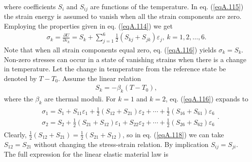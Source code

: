 \documentclass{AeroStructure-ERJohnson}
\begin{document}
where coefficients $S_{i}$ and $S_{i j}$ are functions of the temperature. In eq. (\ref{eqA.115}) the strain energy is assumed to vanish when all the strain components are zero. Employing the properties given in eq. (\ref{eqA.114}) we get
\begin{align}\label{eqA.116}
\sigma_{k}=\frac{\partial U}{\partial \varepsilon_{k}}=S_{k}+\sum_{j=1}^6 \frac{1}{2}(S_{k j}+S_{j k}) \varepsilon_{j},\ k=1,2, \ldots, 6.
\end{align}
Note that when all strain components equal zero, eq. (\ref{eqA.116}) yields $\sigma_{k}=S_{k}$. Non-zero stresses can occur in a state of vanishing strains when there is a change in temperature. Let the change in temperature from the reference state be denoted by $T-T_{0}$. Assume the linear relation
\begin{align}\label{eqA.117}
S_{k}=-\beta_{k}(T-T_{0}),
\end{align}
where the $\beta_{k}$ are thermal moduli. For $k = 1$ and $k = 2$, eq. (\ref{eqA.116}) expands to
\begin{align}\label{eqA.118}
\begin{aligned}
&\sigma_{1}=S_{1}+S_{11} \varepsilon_{1}+\frac{1}{2}(S_{12}+S_{21}) \varepsilon_{2}+\cdots+\frac{1}{2}(S_{16}+S_{61}) \varepsilon_{6}\\ &\sigma_{2}=S_{2}+\frac{1}{2}(S_{21}+S_{12}) \varepsilon_{1}+S_{22} \varepsilon_{2}+\cdots+\frac{1}{2}(S_{26}+S_{62}) \varepsilon_{6} \end{aligned}.
\end{align}
Clearly, $\frac{1}{2}(S_{12}+S_{21})=\frac{1}{2}(S_{21}+S_{12})$, so in eq. (\ref{eqA.118}) we can take $S_{12}=S_{21}$ without changing the stress-strain relation. By implication $S_{i j}=S_{j i}$. The full expression for the linear elastic material law is
\end{document}
